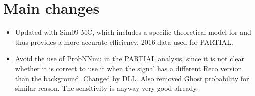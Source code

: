 
\section{Main changes}
\label{sec:todo}

\begin{itemize}
\item Updated with Sim09 MC, which includes a specific theoretical model for \KzPzMuMu and thus provides a more accurate efficiency. 2016 data used for PARTIAL.
\item Avoid the use of ProbNNmu in the PARTIAL analysis, since it is not clear
whether it is correct to use it when the signal has a different Reco version than the background. Changed by DLL. 
Also removed Ghost probability for similar reason. The sensitivity is anyway very good already.
\end{itemize}
